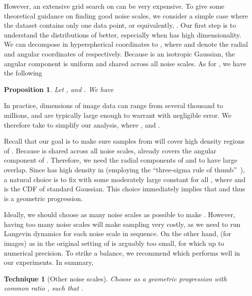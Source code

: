 \documentclass{article}
\newtheorem{recipe}{Technique}
\newtheorem{proposition}{Proposition}
\begin{document}
However, an extensive grid search on  can be very expensive. To give some theoretical guidance on finding good noise scales, we consider a simple case where the dataset contains only one data point, or equivalently, . Our first step is to understand the distributions of  better, especially when  has high dimensionality. We can decompose  in hyperspherical coordinates to , where  and  denote the radial and angular coordinates of  respectively. Because  is an isotropic Gaussian, the angular component  is uniform and shared across all noise scales. As for , we have the following
\begin{proposition}\label{prop:noise_levels}
Let , and . We have

\end{proposition}
In practice, dimensions of image data can range from several thousand to millions, and are typically large enough to warrant  with negligible error. We therefore take  to simplify our analysis, where , and .

Recall that our goal is to make sure samples from  will cover high density regions of . Because  is shared across all noise scales,  already covers the angular component of . Therefore, we need the radial components of  and  to have large overlap. Since  has high density in  (employing the ``three-sigma rule of thumb''~\cite{grafarend2006linear}), a natural choice is to fix  with some moderately large constant  for all , where  and  is the CDF of standard Gaussian. This choice immediately implies that  and thus  is a geometric progression. 


Ideally, we should choose as many noise scales as possible to make . However, having too many noise scales will make sampling very costly, as we need to run Langevin dynamics for each noise scale in sequence. On the other hand,  (for  images) as in the original setting of \cite{song2019generative} is arguably too small, for which  up to numerical precision. To strike a balance, we recommend  which performs well in our experiments. In summary,
\begin{recipe}[Other noise scales]\label{rec:noise_levels}
    Choose  as a geometric progression with common ratio , such that .
\end{recipe}
\end{document}
